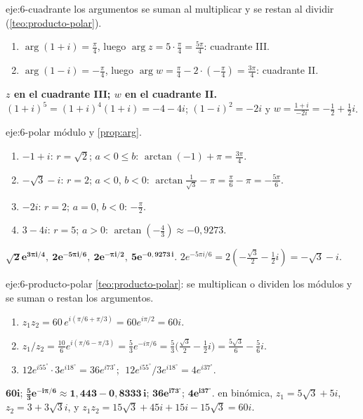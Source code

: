 \begin{solucion}{eje:6-cuadrante}
\planteamiento los argumentos se suman al multiplicar y se restan al dividir (\cref{teo:producto-polar}).
\pasos
\begin{enumerate}[label=\arabic*.]
  \item $\arg(1+i)=\frac{\pi}{4}$, luego $\arg z=5\cdot\frac{\pi}{4}=\frac{5\pi}{4}$: cuadrante III.
  \item $\arg(1-i)=-\frac{\pi}{4}$, luego $\arg w=\frac{\pi}{4}-2\cdot(-\frac{\pi}{4})=\frac{3\pi}{4}$: cuadrante II.
\end{enumerate}
\resultado \textbf{$z$ en el cuadrante III; $w$ en el cuadrante II.}
\comprobacion $(1+i)^{5}=(1+i)^{4}(1+i)=-4-4i$; $(1-i)^{2}=-2i$ y $w=\frac{1+i}{-2i}=-\frac12+\frac12i$.
\end{solucion}

\begin{solucion}{eje:6-polar}
\planteamiento módulo y \cref{prop:arg}.
\pasos
\begin{enumerate}[label=\arabic*.]
  \item $-1+i$: $r=\sqrt2$; $a<0\le b$: $\arctan(-1)+\pi=\frac{3\pi}{4}$.
  \item $-\sqrt3-i$: $r=2$; $a<0$, $b<0$: $\arctan\frac{1}{\sqrt3}-\pi=\frac{\pi}{6}-\pi=-\frac{5\pi}{6}$.
  \item $-2i$: $r=2$; $a=0$, $b<0$: $-\frac{\pi}{2}$.
  \item $3-4i$: $r=5$; $a>0$: $\arctan(-\frac43)\approx-0{,}9273$.
\end{enumerate}
\resultado $\mathbf{\sqrt2e^{3\pi i/4},\ 2e^{-5\pi i/6},\ 2e^{-\pi i/2},\ 5e^{-0{,}9273\,i}}$.
\comprobacion $2e^{-5\pi i/6}=2(-\frac{\sqrt3}{2}-\frac12i)=-\sqrt3-i$.
\end{solucion}

\begin{solucion}{eje:6-producto-polar}
\planteamiento \cref{teo:producto-polar}: se multiplican o dividen los módulos y se suman o restan los argumentos.
\pasos
\begin{enumerate}[label=\arabic*.]
  \item $z_1z_2=60\,e^{i(\pi/6+\pi/3)}=60e^{i\pi/2}=60i$.
  \item $z_1/z_2=\frac{10}{6}e^{i(\pi/6-\pi/3)}=\frac53e^{-i\pi/6}=\frac53\bigl(\frac{\sqrt3}{2}-\frac12i\bigr)=\frac{5\sqrt3}{6}-\frac56i$.
  \item $12e^{i55^{\circ}}\cdot3e^{i18^{\circ}}=36e^{i73^{\circ}}$; $\;12e^{i55^{\circ}}/3e^{i18^{\circ}}=4e^{i37^{\circ}}$.
\end{enumerate}
\resultado $\mathbf{60i}$; $\mathbf{\frac53e^{-i\pi/6}\approx1{,}443-0{,}8333\,i}$; $\mathbf{36e^{i73^{\circ}}}$; $\mathbf{4e^{i37^{\circ}}}$.
\comprobacion en binómica, $z_1=5\sqrt3+5i$, $z_2=3+3\sqrt3i$, y $z_1z_2=15\sqrt3+45i+15i-15\sqrt3=60i$.
\end{solucion}

